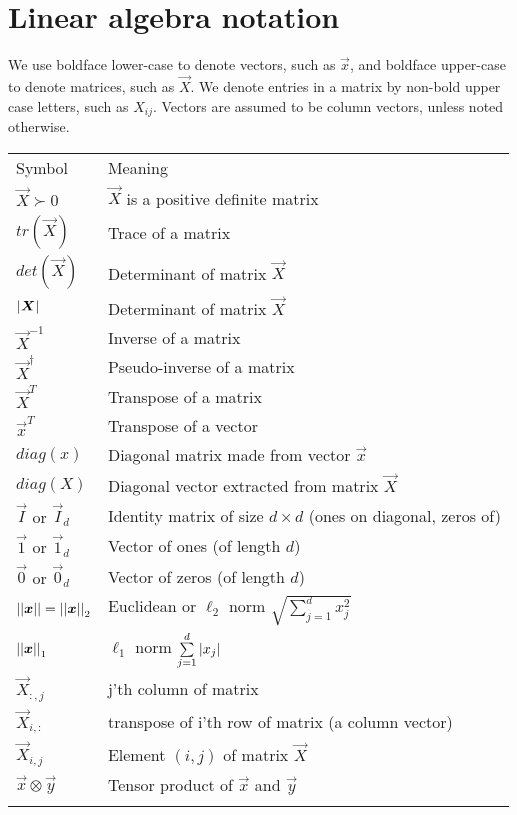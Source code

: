 \section*{Linear algebra notation}
We use boldface lower-case to denote vectors, such as $\vec{x}$, and boldface upper-case to denote matrices, such as $\vec{X}$. We denote entries in a matrix by non-bold upper case letters, such as $X_{ij}$. Vectors are assumed to be column vectors, unless noted otherwise.

\begin{longtable}{p{2.4cm}p{8.9cm}}
Symbol & Meaning \\
\noalign{\smallskip}\hline\noalign{\smallskip}
$\vec{X} \succ 0$ & $\vec{X}$ is a positive definite matrix\\
$tr(\vec{X})$ & Trace of a matrix\\
$det(\vec{X})$ & Determinant of matrix $\vec{X}$\\
$\abs{\vec{X}}$ & Determinant of matrix $\vec{X}$\\
$\vec{X}^{-1}$ & Inverse of a matrix\\
$\vec{X}^{\dagger}$ & Pseudo-inverse of a matrix\\
$\vec{X}^T$ & Transpose of a matrix\\
$\vec{x}^T$ & Transpose of a vector\\
$diag(x)$ & Diagonal matrix made from vector $\vec{x}$\\
$diag(X)$ & Diagonal vector extracted from matrix $\vec{X}$\\
$\vec{I}$ or $\vec{I}_d$ & Identity matrix of size $d \times d$ (ones on diagonal, zeros of)\\
$\vec{1}$ or $\vec{1}_d$ & Vector of ones (of length $d$)\\
$\vec{0}$ or $\vec{0}_d$ & Vector of zeros (of length $d$)\\
$\abs{\abs{\vec{x}}}=\abs{\abs{\vec{x}}}_2$ & Euclidean or $\ell_2$ norm $\sqrt{\sum\limits_{j=1}^{d} x_j^2}$\\
$\abs{\abs{\vec{x}}}_1$ & $\ell_1$ norm $\sum\limits_{j=1}^{d} \left\lvert x_j\right\rvert$\\
$\vec{X}_{:,j}$ & j’th column of matrix\\
$\vec{X}_{i,:}$ & transpose of i’th row of matrix (a column vector)\\
$\vec{X}_{i,j}$ & Element $(i,j)$ of matrix $\vec{X}$ \\
$\vec{x} \otimes \vec{y}$ & Tensor product of $\vec{x}$ and $\vec{y}$\\
\noalign{\smallskip}\hline\noalign{\smallskip}
\end{longtable}



